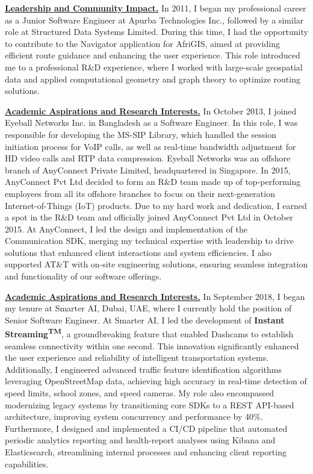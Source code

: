 \textbf{\underline{Leadership and Community Impact.}}
In 2011, I began my professional career as a Junior Software Engineer at Apurba Technologies Inc.,
followed by a similar role at Structured Data Systems Limited.
During this time, I had the opportunity to contribute to the Navigator application for AfriGIS,
aimed at providing efficient route guidance and enhancing the user experience.
This role introduced me to a professional R\&D experience, where I worked with large-scale geospatial data
and applied computational geometry and graph theory to optimize routing solutions.


\textbf{\underline{Academic Aspirations and Research Interests.}}
In October 2013, I joined Eyeball Networks Inc. in Bangladesh as a Software Engineer.
In this role, I was responsible for developing the MS-SIP Library, which handled the session initiation process for VoIP calls,
as well as real-time bandwidth adjustment for HD video calls and RTP data compression.
Eyeball Networks was an offshore branch of AnyConnect Private Limited, headquartered in Singapore.
In 2015, AnyConnect Pvt Ltd decided to form an R\&D team made up of top-performing employees
from all its offshore branches to focus on their next-generation Internet-of-Things (IoT) products.
Due to my hard work and dedication, I earned a spot in the R\&D team and officially joined AnyConnect Pvt Ltd in October 2015.
At AnyConnect, I led the design and implementation of the Communication SDK, merging my technical expertise
with leadership to drive solutions that enhanced client interactions and system efficiencies.
I also supported AT\&T with on-site engineering solutions, ensuring seamless integration and functionality of our software offerings.

\newpage

\textbf{\underline{Academic Aspirations and Research Interests.}}
In September 2018, I began my tenure at Smarter AI, Dubai, UAE, where I currently hold the position of Senior Software Engineer.
At Smarter AI, I led the development of \textbf{Instant Streaming\textsuperscript{TM}}, a groundbreaking feature
that enabled Dashcams to establish seamless connectivity within one second.
This innovation significantly enhanced the user experience and reliability of intelligent transportation systems.
Additionally, I engineered advanced traffic feature identification algorithms leveraging OpenStreetMap data,
achieving high accuracy in real-time detection of speed limits, school zones, and speed cameras.
My role also encompassed modernizing legacy systems by transitioning core SDKs to a REST API-based architecture,
improving system concurrency and performance by 40\%.
Furthermore, I designed and implemented a CI/CD pipeline that automated periodic analytics reporting and health-report
analyses using Kibana and Elasticsearch, streamlining internal processes and enhancing client reporting capabilities.


